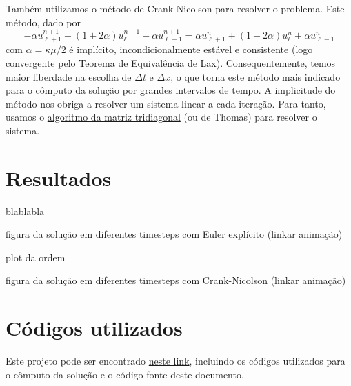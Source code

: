\documentclass[twocolumn,showpacs,%
  nofootinbib,aps,superscriptaddress,%
  eqsecnum,prd,notitlepage,showkeys,10pt]{revtex4-1} %
\begin{document}
	Também utilizamos o método de Crank-Nicolson para resolver o problema.
	Este método, dado por
	\begin{equation}
		\label{eq:crank-nicolson}
		-\alpha u^{n+1}_{\ell + 1} + (1 + 2\alpha)u^{n+1}_{\ell} - \alpha u^{n+1}_{\ell - 1}
		= \alpha u^{n}_{\ell + 1} + (1 - 2\alpha)u^{n}_{\ell} + \alpha u^{n}_{\ell - 1}
	\end{equation}
	com $\alpha = \kappa\mu/2$ é implícito, incondicionalmente estável e consistente
	(logo convergente pelo Teorema de Equivalência de Lax).
	Consequentemente, temos maior liberdade na escolha de $\Delta t$ e $\Delta x$, o que torna
	este método mais indicado para o cômputo da solução por grandes intervalos de tempo.
	A implicitude do método nos obriga a resolver um sistema linear a cada iteração.
	Para tanto, usamos o \href{https://en.wikipedia.org/wiki/Tridiagonal_matrix_algorithm}{algoritmo da matriz tridiagonal}
	(ou de Thomas) para resolver o sistema.
%
\section{Resultados}
%
	blablabla

	figura da solução em diferentes timesteps com Euler explícito (linkar animação)

	plot da ordem

	figura da solução em diferentes timesteps com Crank-Nicolson (linkar animação)





%
\section{Códigos utilizados}
%
	Este projeto pode ser encontrado
	\href{https://github.com/CaioTomas/Trabalho-IMCEDP}{neste link},
	incluindo os códigos utilizados para o cômputo da solução e o código-fonte
	deste documento.



\end{document}

